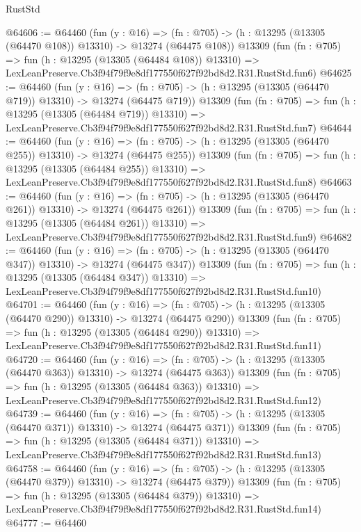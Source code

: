 \begin{lexlean}{RustStd}
\begin{coremodule}
@64606 := @64460
    (fun (y : @16) =>
    (fn : @705) -> (h : @13295 (@13305 (@64470 @108)) @13310) -> @13274 (@64475 @108))
    @13309
    (fun (fn : @705) =>
    fun (h : @13295 (@13305 (@64484 @108)) @13310) =>
    LexLeanPreserve.Cb3f94f79f9e8df177550f627f92bd8d2.R31.RustStd.fun6)
@64625 := @64460
    (fun (y : @16) =>
    (fn : @705) -> (h : @13295 (@13305 (@64470 @719)) @13310) -> @13274 (@64475 @719))
    @13309
    (fun (fn : @705) =>
    fun (h : @13295 (@13305 (@64484 @719)) @13310) =>
    LexLeanPreserve.Cb3f94f79f9e8df177550f627f92bd8d2.R31.RustStd.fun7)
@64644 := @64460
    (fun (y : @16) =>
    (fn : @705) -> (h : @13295 (@13305 (@64470 @255)) @13310) -> @13274 (@64475 @255))
    @13309
    (fun (fn : @705) =>
    fun (h : @13295 (@13305 (@64484 @255)) @13310) =>
    LexLeanPreserve.Cb3f94f79f9e8df177550f627f92bd8d2.R31.RustStd.fun8)
@64663 := @64460
    (fun (y : @16) =>
    (fn : @705) -> (h : @13295 (@13305 (@64470 @261)) @13310) -> @13274 (@64475 @261))
    @13309
    (fun (fn : @705) =>
    fun (h : @13295 (@13305 (@64484 @261)) @13310) =>
    LexLeanPreserve.Cb3f94f79f9e8df177550f627f92bd8d2.R31.RustStd.fun9)
@64682 := @64460
    (fun (y : @16) =>
    (fn : @705) -> (h : @13295 (@13305 (@64470 @347)) @13310) -> @13274 (@64475 @347))
    @13309
    (fun (fn : @705) =>
    fun (h : @13295 (@13305 (@64484 @347)) @13310) =>
    LexLeanPreserve.Cb3f94f79f9e8df177550f627f92bd8d2.R31.RustStd.fun10)
@64701 := @64460
    (fun (y : @16) =>
    (fn : @705) -> (h : @13295 (@13305 (@64470 @290)) @13310) -> @13274 (@64475 @290))
    @13309
    (fun (fn : @705) =>
    fun (h : @13295 (@13305 (@64484 @290)) @13310) =>
    LexLeanPreserve.Cb3f94f79f9e8df177550f627f92bd8d2.R31.RustStd.fun11)
@64720 := @64460
    (fun (y : @16) =>
    (fn : @705) -> (h : @13295 (@13305 (@64470 @363)) @13310) -> @13274 (@64475 @363))
    @13309
    (fun (fn : @705) =>
    fun (h : @13295 (@13305 (@64484 @363)) @13310) =>
    LexLeanPreserve.Cb3f94f79f9e8df177550f627f92bd8d2.R31.RustStd.fun12)
@64739 := @64460
    (fun (y : @16) =>
    (fn : @705) -> (h : @13295 (@13305 (@64470 @371)) @13310) -> @13274 (@64475 @371))
    @13309
    (fun (fn : @705) =>
    fun (h : @13295 (@13305 (@64484 @371)) @13310) =>
    LexLeanPreserve.Cb3f94f79f9e8df177550f627f92bd8d2.R31.RustStd.fun13)
@64758 := @64460
    (fun (y : @16) =>
    (fn : @705) -> (h : @13295 (@13305 (@64470 @379)) @13310) -> @13274 (@64475 @379))
    @13309
    (fun (fn : @705) =>
    fun (h : @13295 (@13305 (@64484 @379)) @13310) =>
    LexLeanPreserve.Cb3f94f79f9e8df177550f627f92bd8d2.R31.RustStd.fun14)
@64777 := @64460

\end{coremodule}
\end{lexlean}

